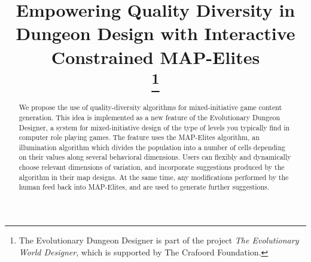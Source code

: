 \documentclass[conference]{IEEEtran}
\begin{document}
\title{Empowering Quality Diversity in Dungeon Design with Interactive Constrained MAP-Elites\\
{}
\thanks{The Evolutionary Dungeon Designer is part of the project \textit{The Evolutionary World Designer}, which is supported by The Crafoord Foundation.}
}

\author{
}


\maketitle

\begin{abstract}
We propose the use of quality-diversity algorithms for mixed-initiative game content generation. This idea is implemented as a new feature of the Evolutionary Dungeon Designer, a system for mixed-initiative design of the type of levels you typically find in computer role playing games. The feature uses the MAP-Elites algorithm, an illumination algorithm which divides the population into a number of cells depending on their values along several behavioral dimensions. Users can flexibly and dynamically choose relevant dimensions of variation, and incorporate suggestions produced by the algorithm in their map designs. At the same time, any modifications performed by the human feed back into MAP-Elites, and are used to generate further suggestions.
\end{abstract}
\end{document}
